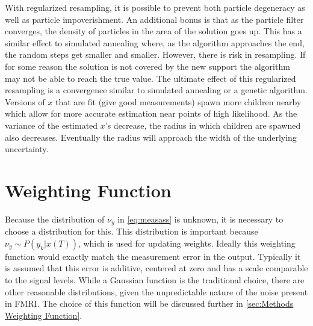 With regularized resampling, it is possible to prevent both
particle degeneracy as well as particle impoverishment. An additional
bonus is that as the particle filter converges, the density of particles
in the area of the solution goes up. This has a similar effect to 
simulated annealing where, as the algorithm approaches the end, the
random steps get smaller and smaller. However, there is risk in 
resampling. If for some reason the solution is not covered by the 
new support the algorithm may not be able to reach the true value. 
The ultimate effect of this regularized resampling is a convergence similar to simulated annealing
or a genetic algorithm. Versions of $x$ that are fit (give good measurements) spawn more children 
nearby which allow for more accurate estimation near points of high likelihood. 
As the variance of the estimated
$x$'s decrease, the radius in which children are spawned also decreases. Eventually the radius
will approach the width of the underlying uncertainty.

\section{Weighting Function}
Because the distribution of $\nu_y$ in \autoref{eq:measass} is unknown,
it is necessary to choose a distribution for this. This distribution
is important because $\nu_y \sim P(y_k | x(T))$, which is used
for updating weights. Ideally this weighting function would exactly 
match the measurement error in the output. 
Typically it is assumed that this error is additive, centered at zero and 
has a scale comparable to the signal levels.
While a Gaussian function is the traditional choice, there are other reasonable
distributions, given the unpredictable nature of the noise present in FMRI.
The choice of this function will be discussed further in \autoref{sec:Methods Weighting Function}.

